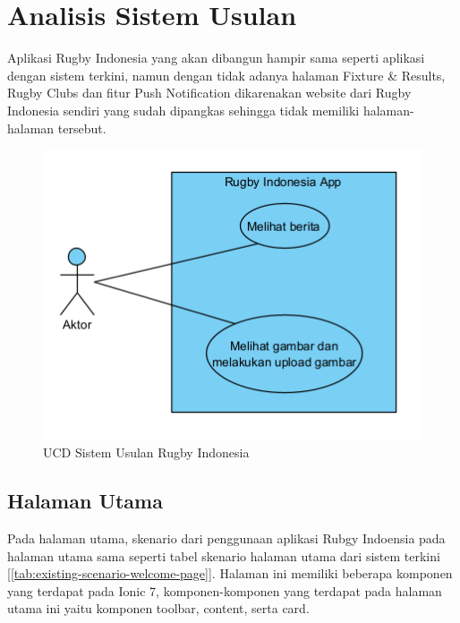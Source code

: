 \section{Analisis Sistem Usulan}
Aplikasi Rugby Indonesia yang akan dibangun hampir sama seperti aplikasi dengan sistem terkini, namun dengan tidak adanya halaman Fixture \& Results, Rugby Clubs dan fitur Push Notification dikarenakan website dari Rugby Indonesia sendiri yang sudah dipangkas sehingga tidak memiliki halaman-halaman tersebut.

\begin{figure} [!h]
    \centering
    \includegraphics{Gambar/UCD-Proposal-Rugby-App.png}
    \caption{UCD Sistem Usulan Rugby Indonesia}
    \label{fig:proposal-ucd-rugby-indonesia}
\end{figure}

\subsection{Halaman Utama}
Pada halaman utama, skenario dari penggunaan aplikasi Rubgy Indoensia pada halaman utama sama seperti tabel skenario halaman utama dari sistem terkini [\ref{tab:existing-scenario-welcome-page}]. Halaman ini memiliki beberapa komponen yang terdapat pada Ionic 7, komponen-komponen yang terdapat pada halaman utama ini yaitu komponen toolbar, content, serta card. 

